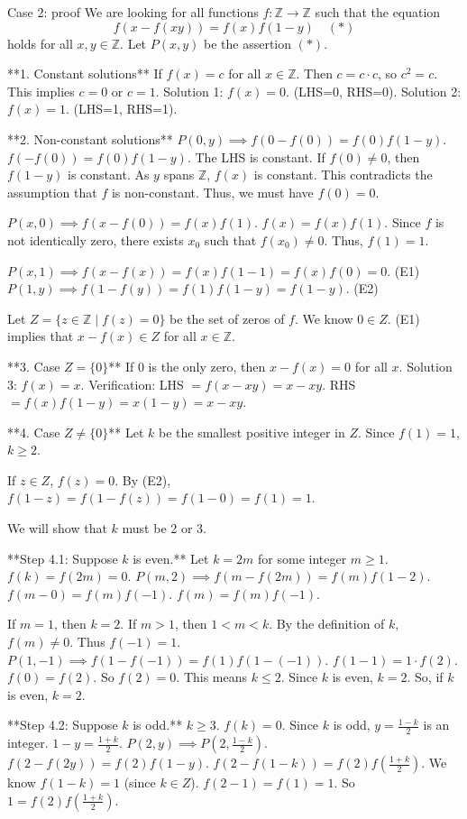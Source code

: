 \documentclass{article} %
\begin{document}
\begin{promptbox}{Case 2: proof}
We are looking for all functions $f:\mathbb{Z}\rightarrow\mathbb{Z}$ such that the equation
\[
 f(x-f(xy))=f(x)f(1-y) \quad (*)
\]
holds for all $x,y\in\mathbb{Z}$. Let $P(x, y)$ be the assertion $(*)$.

**1. Constant solutions**
If $f(x)=c$ for all $x\in\mathbb{Z}$. Then $c = c \cdot c$, so $c^2=c$. This implies $c=0$ or $c=1$.
Solution 1: $f(x)=0$. (LHS=0, RHS=0).
Solution 2: $f(x)=1$. (LHS=1, RHS=1).

**2. Non-constant solutions**
$P(0, y) \implies f(0-f(0)) = f(0)f(1-y)$.
$f(-f(0)) = f(0)f(1-y)$.
The LHS is constant. If $f(0) \neq 0$, then $f(1-y)$ is constant. As $y$ spans $\mathbb{Z}$, $f(x)$ is constant. This contradicts the assumption that $f$ is non-constant.
Thus, we must have $f(0)=0$.

$P(x, 0) \implies f(x-f(0)) = f(x)f(1)$.
$f(x) = f(x)f(1)$.
Since $f$ is not identically zero, there exists $x_0$ such that $f(x_0) \neq 0$. Thus, $f(1)=1$.

$P(x, 1) \implies f(x-f(x)) = f(x)f(1-1) = f(x)f(0) = 0$. (E1)
$P(1, y) \implies f(1-f(y)) = f(1)f(1-y) = f(1-y)$. (E2)

Let $Z = \{z \in \mathbb{Z} \mid f(z)=0\}$ be the set of zeros of $f$. We know $0 \in Z$.
(E1) implies that $x-f(x) \in Z$ for all $x \in \mathbb{Z}$.

**3. Case $Z=\{0\}$**
If $0$ is the only zero, then $x-f(x)=0$ for all $x$.
Solution 3: $f(x)=x$.
Verification: LHS $= f(x-xy) = x-xy$. RHS $= f(x)f(1-y) = x(1-y) = x-xy$.

**4. Case $Z \neq \{0\}$**
Let $k$ be the smallest positive integer in $Z$. Since $f(1)=1$, $k \ge 2$.

If $z \in Z$, $f(z)=0$. By (E2), $f(1-z) = f(1-f(z)) = f(1-0) = f(1) = 1$.

We will show that $k$ must be 2 or 3.

**Step 4.1: Suppose $k$ is even.**
Let $k=2m$ for some integer $m \ge 1$. $f(k)=f(2m)=0$.
$P(m, 2) \implies f(m-f(2m)) = f(m)f(1-2)$.
$f(m-0) = f(m)f(-1)$.
$f(m) = f(m)f(-1)$.

If $m=1$, then $k=2$.
If $m>1$, then $1 < m < k$. By the definition of $k$, $f(m) \neq 0$.
Thus $f(-1)=1$.
$P(1, -1) \implies f(1-f(-1)) = f(1)f(1-(-1))$.
$f(1-1) = 1 \cdot f(2)$.
$f(0) = f(2)$. So $f(2)=0$.
This means $k \le 2$. Since $k$ is even, $k=2$.
So, if $k$ is even, $k=2$.

**Step 4.2: Suppose $k$ is odd.**
$k \ge 3$. $f(k)=0$. Since $k$ is odd, $y = \frac{1-k}{2}$ is an integer. $1-y = \frac{1+k}{2}$.
$P(2, y) \implies P(2, \frac{1-k}{2})$.
$f(2-f(2y)) = f(2)f(1-y)$.
$f(2-f(1-k)) = f(2)f(\frac{1+k}{2})$.
We know $f(1-k)=1$ (since $k \in Z$).
$f(2-1) = f(1) = 1$.
So $1 = f(2)f(\frac{1+k}{2})$.


\end{promptbox}
\end{document}

